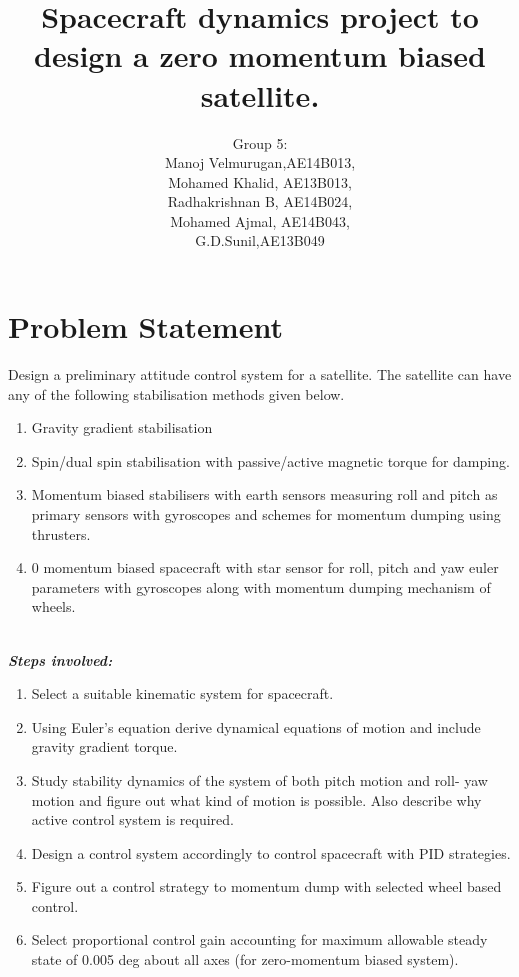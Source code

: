 \documentclass[10pt,a4paper]{report}
\author{Group 5:\\Manoj Velmurugan,AE14B013,\\Mohamed Khalid, AE13B013,\\Radhakrishnan B, AE14B024,\\Mohamed Ajmal, AE14B043,\\G.D.Sunil,AE13B049 }
\title{Spacecraft dynamics project to design a zero momentum biased satellite.}
\begin{document}
\maketitle
\tableofcontents
\chapter{Problem Statement}
Design a preliminary attitude control system for a satellite. The satellite can have any of the following stabilisation methods given below.
\begin{enumerate}
\item Gravity gradient stabilisation
\item Spin/dual spin stabilisation with passive/active magnetic torque for damping. 
\item Momentum biased stabilisers with earth sensors measuring roll and pitch as primary sensors with gyroscopes and schemes for momentum dumping using thrusters.
\item 0 momentum biased spacecraft with star sensor for roll, pitch and yaw euler parameters with gyroscopes along with momentum dumping mechanism of wheels.\\
\\
\end{enumerate}

\emph{\textbf{Steps involved:}}
\begin{enumerate}
\item Select a suitable kinematic system for spacecraft.
\item Using Euler's equation derive dynamical equations of motion and include gravity gradient torque.
\item Study stability dynamics of the system of both pitch motion and roll-
yaw motion and figure out what kind of motion is possible. Also describe why active control system is required.
\item Design a control system accordingly to control spacecraft with PID strategies.
\item Figure out a control strategy to momentum dump with selected wheel based control.
\item Select proportional control gain accounting for maximum allowable steady state 
of 0.005 deg about all axes (for zero-momentum biased system).

\end{enumerate}
\end{document}

